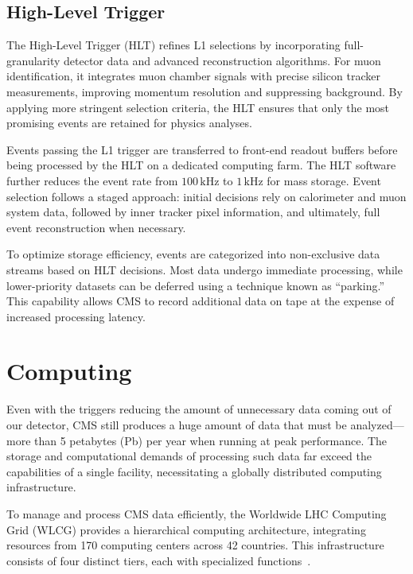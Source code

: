 \subsection{High-Level Trigger}

The High-Level Trigger (HLT) refines L1 selections by incorporating full-granularity detector data and advanced reconstruction algorithms. For muon identification, it integrates muon chamber signals with precise silicon tracker measurements, improving momentum resolution and suppressing background. By applying more stringent selection criteria, the HLT ensures that only the most promising events are retained for physics analyses.

Events passing the L1 trigger are transferred to front-end readout buffers before being processed by the HLT on a dedicated computing farm. The HLT software further reduces the event rate from $100\,\mathrm{kHz}$ to $1\,\mathrm{kHz}$ for mass storage. Event selection follows a staged approach: initial decisions rely on calorimeter and muon system data, followed by inner tracker pixel information, and ultimately, full event reconstruction when necessary.

To optimize storage efficiency, events are categorized into non-exclusive data streams based on HLT decisions. Most data undergo immediate processing, while lower-priority datasets can be deferred using a technique known as ``parking.'' This capability allows CMS to record additional data on tape at the expense of increased processing latency.

\section{Computing}

Even with the triggers reducing the amount of unnecessary data coming out of our detector, CMS still produces a huge amount of data that must be analyzed---more than 5 petabytes (Pb) per year when running at peak performance. The storage and computational demands of processing such data far exceed the capabilities of a single facility, necessitating a globally distributed computing infrastructure.

To manage and process CMS data efficiently, the Worldwide LHC Computing Grid (WLCG) provides a hierarchical computing architecture, integrating resources from 170 computing centers across 42 countries. This infrastructure consists of four distinct tiers, each with specialized functions~\cite{Cittolin:578006, SHIERS2007219, Bayatyan:838359}.

